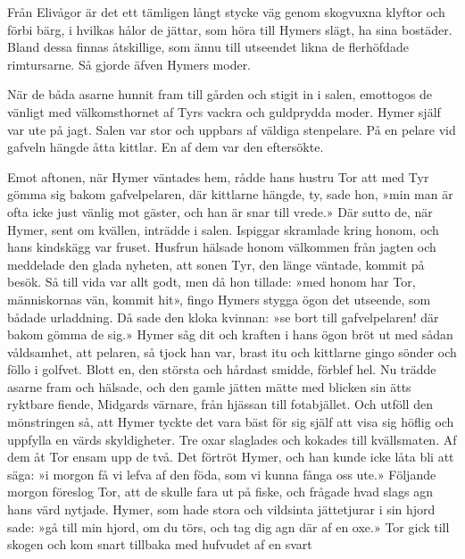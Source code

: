 Från Elivågor är det ett tämligen långt stycke väg genom skogvuxna
klyftor och förbi bärg, i hvilkas hålor de jättar, som höra till Hymers
slägt, ha sina bostäder. Bland dessa finnas åtskillige, som ännu till
utseendet likna de flerhöfdade rimtursarne. Så gjorde äfven Hymers
moder.

När de båda asarne hunnit fram till gården och stigit in i salen,
emottogos de vänligt med välkomsthornet af Tyrs vackra och guldprydda
moder. Hymer själf var ute på jagt. Salen var stor och uppbars af
väldiga stenpelare. På en pelare vid gafveln hängde åtta kittlar. En af
dem var den eftersökte.

Emot aftonen, när Hymer väntades hem, rådde hans hustru Tor att med Tyr
gömma sig bakom gafvelpelaren, där kittlarne hängde, ty, sade hon, »min
man är ofta icke just vänlig mot gäster, och han är snar till vrede.»
Där sutto de, när Hymer, sent om kvällen, inträdde i salen. Ispiggar
skramlade kring honom, och hans kindskägg var fruset. Husfrun hälsade
honom välkommen från jagten och meddelade den glada nyheten, att sonen
Tyr, den länge väntade,
\protect\hypertarget{lb1625905.xhtmlux5cux23start49}{}{}\protect\hypertarget{lb1625905.xhtmlux5cux23start49-a}{}{}\protect\hypertarget{lb1625905.xhtmlux5cux23start49-b}{}{}\protect\hypertarget{lb1625905.xhtmlux5cux23start49-c}{}{}\protect\hypertarget{lb1625905.xhtmlux5cux23start49-d}{}{}
kommit på besök. Så till vida var allt godt, men då hon tillade: »med
honom har Tor, människornas vän, kommit hit», fingo Hymers stygga ögon
det utseende, som bådade urladdning. Då sade den kloka kvinnan: »se bort
till gafvelpelaren! där bakom gömma de sig.» Hymer såg dit och kraften i
hans ögon bröt ut med sådan våldsamhet, att pelaren, så tjock han var,
brast itu och kittlarne gingo sönder och föllo i golfvet. Blott en, den
största och hårdast smidde, förblef hel. Nu trädde asarne fram och
hälsade, och den gamle jätten mätte med blicken sin ätts ryktbare
fiende, Midgards värnare, från hjässan till fotabjället. Och utföll den
mönstringen så, att Hymer tyckte det vara bäst för sig själf att visa
sig höflig och uppfylla en värds skyldigheter. Tre oxar slaglades och
kokades till kvällsmaten. Af dem åt Tor ensam upp de två. Det förtröt
Hymer, och han kunde icke låta bli att säga: »i morgon få vi lefva af
den föda, som vi kunna fånga oss ute.» Följande morgon föreslog Tor, att
de skulle fara ut på fiske, och frågade hvad slags agn hans värd
nytjade. Hymer, som hade stora och vildsinta jättetjurar i sin hjord
sade: »gå till min hjord, om du törs, och tag dig agn där af en oxe.»
Tor gick till skogen och kom snart tillbaka med hufvudet af en svart
